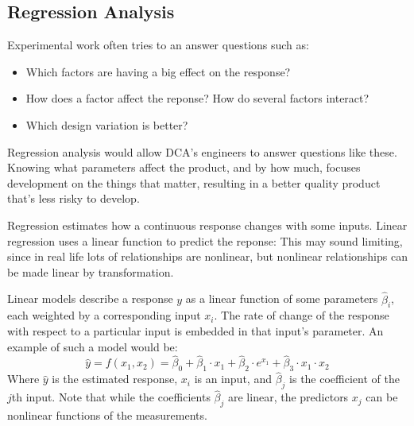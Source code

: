 \documentclass[11pt,a4paper,article]{memoir} %
\begin{document}
\subsection*{Regression Analysis}
Experimental work often tries to an answer questions such as:
\vspace{-10pt}
\begin{itemize}
\item Which factors are having a big effect on the response?
\item How does a factor affect the reponse? How do several factors interact?
\item Which design variation is better?
\end{itemize}
\vspace{-10pt}
 Regression analysis would allow DCA's engineers to answer questions like these. Knowing what parameters affect the product, and by how much,  focuses development on the things that matter, resulting in a better quality product that's less risky to develop.
 \par
 Regression estimates how a continuous response changes with some inputs. Linear regression uses a linear function to predict the reponse: This may sound limiting, since in real life lots of relationships are nonlinear, but nonlinear relationships can be made linear by transformation.
\par
  Linear models describe a response $y$ as a linear function of some parameters $\hat{\beta}_i$, each weighted by a corresponding input $x_i$. The rate of change of the response with respect to a particular input is embedded in that input's parameter. An example of such a model would be:
\begin{equation}
	\hat{y} = f(x_1, x_2) = \hat{\beta}_0 + \hat{\beta}_1 \cdot x_1 + \hat{\beta}_2 \cdot e^{x_1}+ \hat{\beta}_3 \cdot x_1 \cdot x_2
\end{equation}
Where $\hat{y}$ is the estimated response, $x_i$ is an input, and $\hat{\beta}_j$ is the coefficient of the $j$th input. Note that while the coefficients $\hat{\beta}_j$ are linear, the predictors $x_j$ can be nonlinear functions of the measurements.
\end{document}
